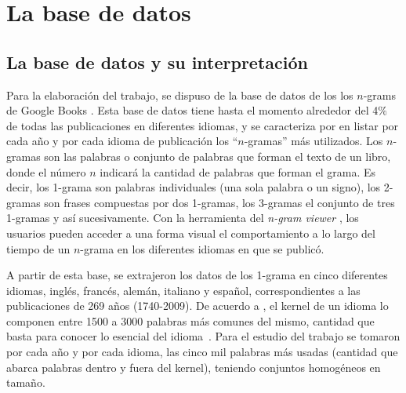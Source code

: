 \chapter{La base de datos}


\section{La base de datos y su interpretación} %

Para la elaboración del trabajo,  se dispuso de la base de datos de los los
$n$-grams de Google Books  \cite{ngramv} . Esta base de datos
tiene hasta el momento alrededor del 4$\%$ de todas las publicaciones en
diferentes idiomas,  y se caracteriza por en listar  por cada año y por cada
idioma de publicación los ``$n$-gramas''  más utilizados.   Los $n$-gramas son
las palabras o conjunto de palabras que forman el texto de un libro, donde el
número $n$ indicará la cantidad de palabras que forman el grama.  Es decir, los
1-grama son palabras individuales (una sola palabra o un signo), los 2-gramas
son frases compuestas por dos 1-gramas, los 3-gramas el conjunto de tres 1-gramas
y así sucesivamente.   Con la herramienta del \textit{n-gram viewer}
\cite{ngramv}, los usuarios pueden acceder a una forma visual el comportamiento
a lo largo del tiempo de un $n$-grama en los diferentes idiomas en que se
publicó.  

A partir de esta base, se extrajeron los datos de los 1-grama en cinco
diferentes idiomas, inglés, francés, alemán, italiano y español,
correspondientes a las publicaciones de 269 años (1740-2009).  De acuerdo a
\cite{languagesascool},  el kernel de un idioma lo componen entre 1500 a 3000 palabras
más comunes del mismo,  cantidad que basta para conocer lo esencial del idioma~.  Para el
estudio del trabajo se tomaron por cada año y por cada idioma,  las cinco mil
palabras más usadas (cantidad que abarca palabras dentro y fuera del kernel),
teniendo conjuntos homogéneos en tamaño.

